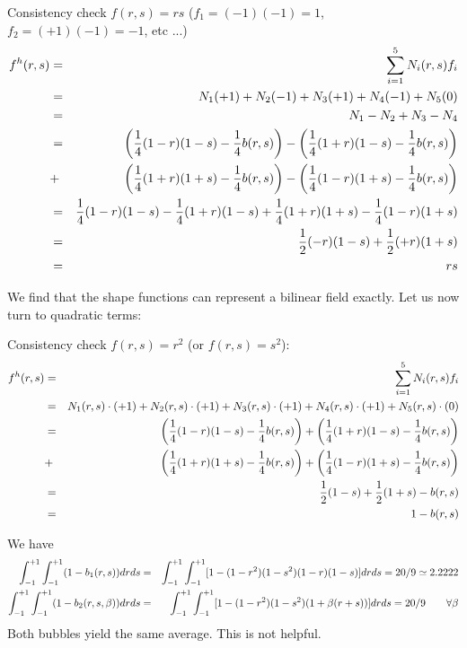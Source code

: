 Consistency check $f(r,s)=rs$ ($f_1=(-1)(-1)=1$, $f_2=(+1)(-1)=-1$, etc ...)
\begin{eqnarray}
f^h(r,s) 
&=& \sum_{i=1}^5 N_i(r,s) f_i \nonumber\\
&=& N_1 (+1) + N_2 (-1) + N_3 (+1) + N_4 (-1) + N_5 (0) \nonumber\\
&=& N_1-N_2+N_3-N_4 \nonumber\\
&=& 
\left(\frac{1}{4}(1-r)(1-s)-\frac{1}{4}b(r,s)\right)
-\left(\frac{1}{4}(1+r)(1-s)-\frac{1}{4}b(r,s)\right) \nonumber\\
&+& 
\left(\frac{1}{4}(1+r)(1+s)-\frac{1}{4}b(r,s)\right)
-\left(\frac{1}{4}(1-r)(1+s)-\frac{1}{4}b(r,s)\right) \nonumber\\
&=& 
 \frac{1}{4}(1-r)(1-s)
-\frac{1}{4}(1+r)(1-s)
+\frac{1}{4}(1+r)(1+s)
-\frac{1}{4}(1-r)(1+s) \nonumber\\
&=&
 \frac{1}{2}(-r)(1-s)
+\frac{1}{2}(+r)(1+s) \nonumber\\
&=& rs
\end{eqnarray}

We find that the shape functions can represent  a bilinear field exactly. 
Let us now turn to quadratic terms:

Consistency check $f(r,s)=r^2$ (or $f(r,s)=s^2$): 
\begin{eqnarray}
f^h(r,s) 
&=& \sum_{i=1}^5 N_i(r,s) f_i \nonumber\\
&=& N_1(r,s)\cdot (+1) + N_2(r,s)\cdot (+1) + N_3(r,s)\cdot (+1) + N_4(r,s)\cdot (+1) + N_5(r,s)\cdot (0) \nonumber\\
&=& 
\left(\frac{1}{4}(1-r)(1-s)-\frac{1}{4}b(r,s)\right)
+\left(\frac{1}{4}(1+r)(1-s)-\frac{1}{4}b(r,s)\right) \nonumber\\
&+& 
\left(\frac{1}{4}(1+r)(1+s)-\frac{1}{4}b(r,s)\right)
+\left(\frac{1}{4}(1-r)(1+s)-\frac{1}{4}b(r,s)\right) \nonumber\\
&=&
\frac{1}{2}(1-s) + \frac{1}{2}(1+s) -b(r,s) \nonumber\\
&=& 
1 - b(r,s) 
\end{eqnarray}

We have 
\begin{eqnarray}
\int_{-1}^{+1} \int_{-1}^{+1} (1-b_1(r,s)) dr ds  
&=& \int_{-1}^{+1} \int_{-1}^{+1} [1 - (1-r^2)(1-s^2)(1-r)(1-s) ] dr ds = 20/9 \simeq 2.2222 \nonumber\\
\int_{-1}^{+1} \int_{-1}^{+1} (1-b_2(r,s,\beta)) dr ds  
&=& \int_{-1}^{+1} \int_{-1}^{+1} [1 - (1-r^2)(1-s^2)(1+\beta(r+s)) ] dr ds = 20/9  \qquad \forall \beta \nonumber 
\end{eqnarray}
Both bubbles yield the same average. This is not helpful. 

